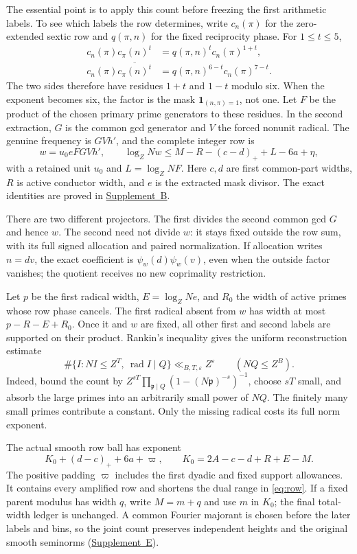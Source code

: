 \documentclass[11pt]{article}
\newcommand{\eps}{\varepsilon}
\newcommand{\supp}[1]{\href{supplement.pdf}{Supplement~#1}}
\begin{document}
The essential point is to apply this count before freezing the first
arithmetic labels. To see which labels the row determines, write
$c_n(\pi)$ for the zero-extended sextic row and $q(\pi,n)$ for the
fixed reciprocity phase. For $1\le t\le5$,
\begin{align*}
 c_n(\pi)c_\pi(n)^t&=q(\pi,n)^t c_n(\pi)^{1+t},\\
 c_n(\pi)\overline{c_\pi(n)^t}
   &=q(\pi,n)^{6-t}c_n(\pi)^{7-t}.
\end{align*}
The two sides therefore have residues $1+t$ and $1-t$ modulo six.
When the exponent becomes six, the factor is the mask
$\mathbf1_{(n,\pi)=1}$, not one. Let $F$ be the product of the chosen primary prime generators to these
residues. In the second extraction, $G$ is the common gcd generator and
$V$ the forced nonunit radical. The genuine frequency is $GVh'$, and
the complete integer row is
\begin{equation}\label{eq:row}
 w=u_0eFGVh',\qquad
 \log_Z Nw\le M-R-(c-d)_++L-6a+\eta,
\end{equation}
with a retained unit $u_0$ and $L=\log_Z NF$.
Here $c,d$ are first common-part widths, $R$ is active conductor width,
and $e$ is the extracted mask divisor. The exact identities are proved
in \supp{B}.

There are two different projectors. The first divides the second common
gcd $G$ and hence $w$. The second need not divide $w$: it stays fixed
outside the row sum, with its full signed allocation and paired
normalization. If allocation writes $n=dv$, the exact coefficient is
$\psi_w(d)\psi_w(v)$, even when the outside factor vanishes; the quotient
receives no new coprimality restriction.

Let $p$ be the first radical width, $E=\log_Z Ne$, and $R_0$ the width
of active primes whose row phase cancels. The first radical absent
from $w$ has width at most $p-R-E+R_0$. Once it and $w$ are fixed, all
other first and second labels are supported on their product. Rankin's
inequality gives the uniform reconstruction estimate
\[
 \#\{I:NI\le Z^T,\ \operatorname{rad}I\mid Q\}
 \ll_{B,T,\eps}Z^\eps\qquad(NQ\le Z^B).
\]
Indeed, bound the count by
$Z^{sT}\prod_{\mathfrak p\mid Q}(1-(N\mathfrak p)^{-s})^{-1}$,
choose $sT$ small, and absorb the large primes into an arbitrarily small
power of $NQ$. The finitely many small primes contribute a constant.
Only the missing radical costs its full norm exponent.

The actual smooth row ball has exponent
\[
 K_0+(d-c)_++6a+\varpi,\qquad K_0=2A-c-d+R+E-M.
\]
The positive padding $\varpi$ includes the first dyadic and fixed support
allowances. It contains every amplified row and shortens the dual range
in \eqref{eq:row}. If a fixed parent modulus has width $q$, write
$M=m+q$ and use $m$ in $K_0$; the final total-width ledger is unchanged.
A common Fourier majorant is chosen before the later labels and bins,
so the joint count preserves independent heights and the original
smooth seminorms (\supp{E}).
\end{document}
